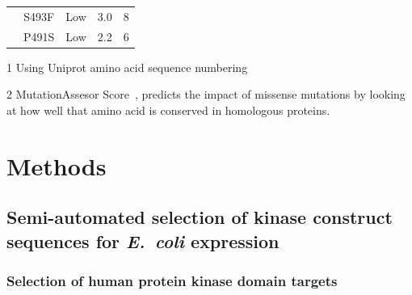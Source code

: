 \documentclass[9pt,lineno]{elife}
\begin{document}
\begin{table}[h!]
\begin{threeparttable}
\begin{tabular}{ccccc}
 &S493F & Low &  3.0 & 8 \\
 &P491S & Low &  2.2 & 6 \\
\bottomrule
\end{tabular}
\begin{tablenotes}
\item[1] Using Uniprot amino acid sequence numbering
\item[2] MutationAssesor Score~\citep{reva_determinants_2007,doi:10.1093/nar/gkr407}, predicts the impact of missense mutations by looking at how well that amino acid is conserved in homologous proteins. 
\end{tablenotes}
\end{threeparttable}
\end{table}

\section{Methods}

\subsection{Semi-automated selection of kinase construct sequences for \emph{E.~coli} expression}

\subsubsection{Selection of human protein kinase domain targets}
\end{document}
